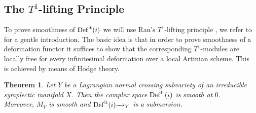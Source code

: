 \documentclass[a4paper,11pt,final]{amsart}
\theoremstyle{plain}
\newtheorem{Thm}[subsection]{Theorem}
\theoremstyle{definition}
\numberwithin{equation}{section}
\theoremstyle{remark}
\begin{document}
\subsection{The $T^1$-lifting Principle} \label{subsec t1-lifting}
To prove smoothness of ${{\operatorname{Def}}}^{{\rm{lt}}}(i)$ we will use Ran's $T^1$-lifting principle \cite{Ra92Def,Ka92, Ka97}, we refer to \cite{mydiss} for a gentle introduction. The basic idea is that in order to prove smoothness of a deformation functor it suffices to show that the corresponding $T^1$-modules are locally free for every infinitesimal deformation over a local Artinian scheme. This is achieved by means of Hodge theory.
\begin{Thm}\label{thm mi smooth}
Let $Y$ be a Lagrangian normal crossing subvariety of an irreducible symplectic manifold $X$. Then the complex space ${{\operatorname{Def}}}^{{\rm{lt}}}(i)$ is smooth at $0$.
Moreover, $M_Y$ is smooth and ${{\operatorname{Def}}}^{{\rm{lt}}}(i) {\xrightarrow{\ \ }}_Y$ is a submersion.
\end{Thm}
\end{document}

